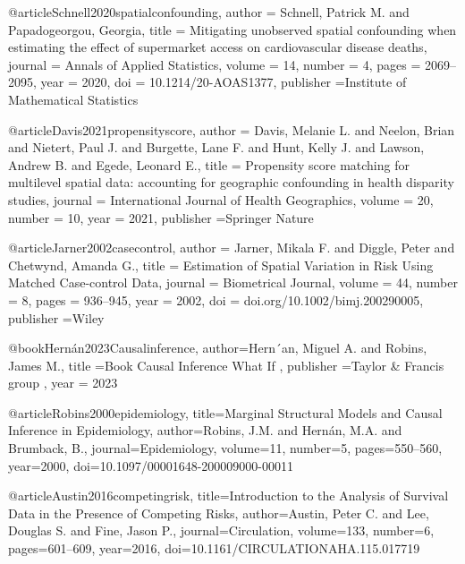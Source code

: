 @article{Schnell2020spatialconfounding,
  author = {Schnell, Patrick M. and Papadogeorgou,  Georgia},
  title = {Mitigating unobserved spatial confounding when estimating the effect of supermarket access on cardiovascular disease deaths},
  journal = {Annals of Applied Statistics},
  volume = {14},
  number = {4},
  pages = {2069--2095},
  year = {2020},
  doi = {10.1214/20-AOAS1377},
  publisher ={Institute of Mathematical Statistics}
}





@article{Davis2021propensityscore,
  author = {Davis, Melanie L. and Neelon, Brian and Nietert, Paul J. and Burgette, Lane F. and Hunt, Kelly J. and Lawson, Andrew B. and Egede, Leonard E.},
  title = {Propensity score matching for multilevel spatial data: accounting for geographic confounding in health disparity studies},
  journal = {International Journal of Health Geographics},
  volume = {20},
  number = {10},
  year = {2021},
  publisher ={Springer Nature}
}






@article{Jarner2002casecontrol,
  author = {Jarner, Mikala F. and Diggle, Peter and Chetwynd, Amanda G.},
  title = {Estimation of Spatial Variation in Risk Using Matched Case-control Data},
  journal = {Biometrical Journal},
  volume = {44},
  number = {8},
  pages = {936--945},
  year = {2002},
  doi = {doi.org/10.1002/bimj.200290005},
  publisher ={Wiley}
}





@book{Hernán2023Causalinference,
    author={Hern´an, Miguel A. and Robins, James M.},
    title ={Book Causal Inference What If} ,
    publisher ={Taylor & Francis group} ,
    year = {2023}
}





@article{Robins2000epidemiology,
  title={Marginal Structural Models and Causal Inference in Epidemiology},
  author={Robins, J.M. and Hernán, M.A. and Brumback, B.},
  journal={Epidemiology},
  volume={11},
  number={5},
  pages={550--560},
  year={2000},
  doi={10.1097/00001648-200009000-00011}
}





@article{Austin2016competingrisk,
  title={Introduction to the Analysis of Survival Data in the Presence of Competing Risks},
  author={Austin, Peter C. and Lee, Douglas S. and Fine, Jason P.},
  journal={Circulation},
  volume={133},
  number={6},
  pages={601--609},
  year={2016},
  doi={10.1161/CIRCULATIONAHA.115.017719}
}





